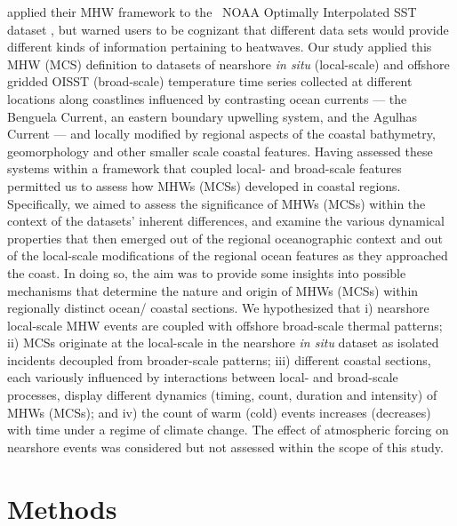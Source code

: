 \documentclass[a4paper,10pt,review]{elsarticle}
\begin{document}
\citet{Hobday2016} applied their MHW framework to the \degree~NOAA Optimally Interpolated SST dataset \citep[hereafter referred to as OISST;][]{Reynolds2007}, but warned users to be cognizant that different data sets would provide different kinds of information pertaining to heatwaves. Our study applied this MHW (MCS) definition to datasets of nearshore \emph{in situ} (local-scale) and offshore gridded OISST (broad-scale) temperature time series collected at different locations along coastlines influenced by contrasting ocean currents --- the Benguela Current, an eastern boundary upwelling system, and the Agulhas Current --- and locally modified by regional aspects of the coastal bathymetry, geomorphology and other smaller scale coastal features. Having assessed these systems within a framework that coupled local- and broad-scale features permitted us to assess how MHWs (MCSs) developed in coastal regions. Specifically, we aimed to assess the significance of MHWs (MCSs) within the context of the datasets’ inherent differences, and examine the various dynamical properties that then emerged out of the regional oceanographic context and out of the local-scale modifications of the regional ocean features as they approached the coast. In doing so, the aim was to provide some insights into possible mechanisms that determine the nature and origin of MHWs (MCSs) within regionally distinct ocean/ coastal sections. We hypothesized that i) nearshore local-scale MHW events are coupled with offshore broad-scale thermal patterns; ii) MCSs originate at the local-scale in the nearshore \emph{in situ} dataset as isolated incidents decoupled from broader-scale patterns; iii) different coastal sections, each variously influenced by interactions between local- and broad-scale processes, display different dynamics (timing, count, duration and intensity) of MHWs (MCSs); and iv) the count of warm (cold) events increases (decreases) with time under a regime of climate change. The effect of atmospheric forcing on nearshore events was considered but not assessed within the scope of this study.

\section{Methods}
\end{document}
